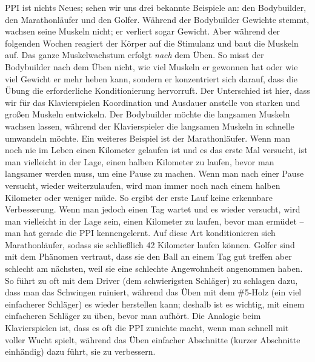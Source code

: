 PPI ist nichts Neues; sehen wir uns drei bekannte Beispiele an: den Bodybuilder, den Marathonläufer und den Golfer.
Während der Bodybuilder Gewichte stemmt, wachsen seine Muskeln nicht; er verliert sogar Gewicht.
Aber während der folgenden Wochen reagiert der Körper auf die Stimulanz und baut die Muskeln auf.
Das ganze Muskelwachstum erfolgt \textit{nach} dem Üben.
So misst der Bodybuilder nach dem Üben nicht, wie viel Muskeln er gewonnen hat oder wie viel Gewicht er mehr heben kann, sondern er konzentriert sich darauf, dass die Übung die erforderliche Konditionierung hervorruft.
Der Unterschied ist hier, dass wir für das Klavierspielen Koordination und Ausdauer anstelle von starken und großen Muskeln entwickeln.
Der Bodybuilder möchte die langsamen Muskeln wachsen lassen, während der Klavierspieler die langsamen Muskeln in schnelle umwandeln möchte.
Ein weiteres Beispiel ist der Marathonläufer.
Wenn man noch nie im Leben einen Kilometer gelaufen ist und es das erste Mal versucht, ist man vielleicht in der Lage, einen halben Kilometer zu laufen, bevor man langsamer werden muss, um eine Pause zu machen.
Wenn man nach einer Pause versucht, wieder weiterzulaufen, wird man immer noch nach einem halben Kilometer oder weniger müde.
So ergibt der erste Lauf keine erkennbare Verbesserung.
Wenn man jedoch einen Tag wartet und es wieder versucht, wird man vielleicht in der Lage sein, einen Kilometer zu laufen, bevor man ermüdet -- man hat gerade die PPI kennengelernt.
Auf diese Art konditionieren sich Marathonläufer, sodass sie schließlich 42 Kilometer laufen können.
Golfer sind mit dem Phänomen vertraut, dass sie den Ball an einem Tag gut treffen aber schlecht am nächsten, weil sie eine schlechte Angewohnheit angenommen haben.
So führt zu oft mit dem Driver (dem schwierigsten Schläger) zu schlagen dazu, dass man das Schwingen ruiniert, während das Üben mit dem \#5-Holz (ein viel einfacherer Schläger) es wieder herstellen kann; deshalb ist es wichtig, mit einem einfacheren Schläger zu üben, bevor man aufhört.
Die Analogie beim Klavierspielen ist, dass es oft die PPI zunichte macht, wenn man schnell mit voller Wucht spielt, während das Üben einfacher Abschnitte (kurzer Abschnitte einhändig) dazu führt, sie zu verbessern.

